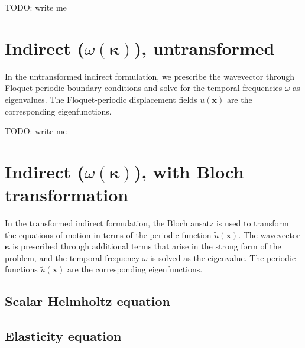\documentclass{article}
\numberwithin{equation}{section}
\newcommand{\vect}[1]{\boldsymbol{#1}}
\newcommand{\x}{x}
\newcommand{\vecx}{\vect{\x}}
\newcommand{\wavenum}{\kappa}
\newcommand{\wavevec}{\vect{\wavenum}}
\newcommand{\kernel}[1]{\tilde{#1}}
\begin{document}
\noindent TODO: write me


\section{Indirect ($\omega(\wavevec)$), untransformed} \label{sec:indirect}

In the untransformed indirect formulation, we prescribe the wavevector through Floquet-periodic boundary conditions and solve for the temporal frequencies \(\omega\) as eigenvalues. The Floquet-periodic displacement fields \(u(\vecx)\) are the corresponding eigenfunctions.

\noindent TODO: write me


\section{Indirect ($\omega(\wavevec)$), with Bloch transformation}
\label{sec:it}

In the transformed indirect formulation, the Bloch ansatz is used to transform the equations of motion in terms of the periodic function \(\kernel{u}(\vecx)\). The wavevector \(\wavevec\) is prescribed through additional terms that arise in the strong form of the problem, and the temporal frequency \(\omega\) is solved as the eigenvalue. The periodic functions \(\kernel{u}(\vecx)\) are the corresponding eigenfunctions.


\subsection{Scalar Helmholtz equation} \label{sec:it.scalar}




\subsection{Elasticity equation} \label{sec:it.vector}

%
\end{document}
